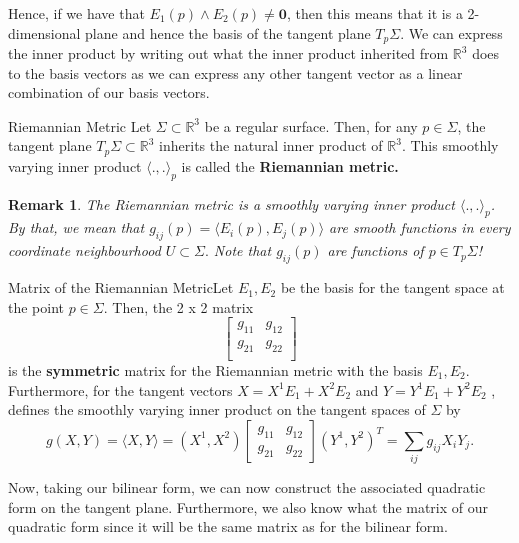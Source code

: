 \documentclass[twoside]{article}
\newtheorem{remark}[theorem]{Remark}
\begin{document}
Hence, if we have that $E_1(p) \wedge E_2(p) \neq \textbf{0}$, then this means that it is a 2-dimensional plane and hence the basis of the tangent plane $T_p\Sigma.$\newline
We can express the inner product by writing out what the inner product inherited from $\mathbb{R}^3$ does to the basis vectors as we can express any other tangent vector as a linear combination of our basis vectors. 

\begin{definition_exam}{Riemannian Metric}{} Let $\Sigma \subset \mathbb{R}^3$ be a regular surface. Then, for any $p \in \Sigma$, the tangent plane $T_p\Sigma \subset \mathbb{R}^3$ inherits the natural inner product of $\mathbb{R}^3$. This smoothly varying inner product $\langle .,. \rangle_p$ is called the \textbf{Riemannian metric.}
\end{definition_exam}

\begin{remark}The Riemannian metric is a smoothly varying inner product $\langle .,. \rangle_p$. By that, we mean that $g_{ij}(p) = \langle E_i(p), E_j(p)\rangle$ are smooth functions in every coordinate neighbourhood $U \subset \Sigma.$ Note that $g_{ij}(p)$ are functions of $p \in T_p\Sigma$!
\end{remark}

\begin{proposition_exam}{Matrix of the Riemannian Metric}{}Let $E_1, E_2$ be the basis for the tangent space at the point $p \in \Sigma.$ Then, the 2 x 2 matrix 
$$
\begin{bmatrix}
g_{11} & g_{12}\\
g_{21} & g_{22}\\
\end{bmatrix}
$$
is the \textbf{symmetric} matrix for the Riemannian metric with the basis $E_1, E_2.$\\
Furthermore, for the tangent vectors $X = X^1E_1 + X^2E_2$ and $Y = Y^1E_1 + Y^2E_2$ , defines the smoothly varying inner product on the tangent spaces of $\Sigma$ by 
$$
g(X,Y) = \langle X,Y \rangle = (X^1, X^2)\begin{bmatrix} g_{11} & g_{12} \\ g_{21} & g_{22}
\end{bmatrix}(Y^1, Y^2)^T = \sum_{ij}g_{ij}X_iY_j.
$$
\end{proposition_exam}

Now, taking our bilinear form, we can now construct the associated quadratic form on the tangent plane. Furthermore, we also know what the matrix of our quadratic form since it will be the same matrix as for the bilinear form.
\end{document}
